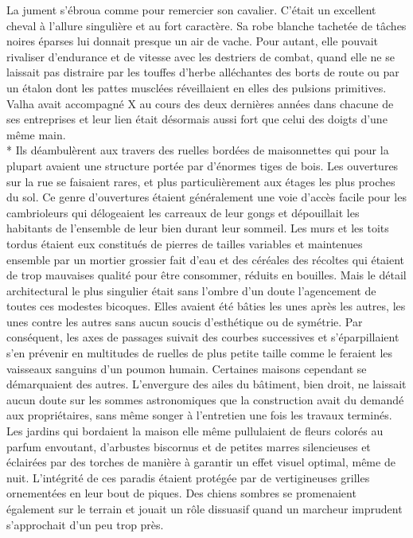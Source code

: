 \documentclass{book}
\begin{document}
La jument s'ébroua comme pour remercier son cavalier. C'était un excellent cheval à l'allure singulière et au fort caractère. Sa robe blanche tachetée de tâches noires éparses lui donnait presque un air de vache. Pour autant, elle pouvait rivaliser d'endurance et de vitesse avec les destriers de combat, quand elle ne se laissait pas distraire par les touffes d'herbe alléchantes 
des borts de route ou par un étalon dont les pattes musclées réveillaient en elles des pulsions primitives. Valha avait accompagné X au cours des deux dernières années dans chacune de ses entreprises et leur lien était désormais aussi fort que celui des doigts d'une même main.   \\*
Ils déambulèrent aux travers des ruelles bordées de maisonnettes qui pour la plupart avaient une structure portée par d'énormes tiges de bois. Les ouvertures sur la rue se faisaient rares, et plus particulièrement aux étages les plus proches du sol. Ce genre d'ouvertures étaient généralement une voie d'accès facile pour les cambrioleurs qui délogeaient les carreaux de leur gongs et dépouillait les habitants de l'ensemble de leur bien durant leur sommeil. Les murs et les toits tordus étaient eux constitués de pierres de tailles variables et maintenues ensemble par un mortier grossier fait d'eau et des céréales des récoltes qui étaient de trop mauvaises qualité pour être consommer, réduits en bouilles. Mais le détail architectural le plus singulier était sans l'ombre d'un doute l'agencement de toutes ces modestes bicoques. Elles avaient été bâties les unes après les autres, les unes contre les autres sans aucun soucis d’esthétique ou de symétrie. Par conséquent, les axes de passages suivait des courbes successives et s'éparpillaient s'en prévenir en multitudes de ruelles de plus petite taille comme le feraient les vaisseaux sanguins d'un poumon humain.
Certaines maisons cependant se démarquaient des autres. L'envergure des ailes du bâtiment, bien droit, ne laissait aucun doute sur les sommes astronomiques que la construction avait du demandé aux propriétaires, sans même songer à l'entretien une fois les travaux terminés. Les jardins qui bordaient la maison elle même pullulaient de fleurs colorés au parfum envoutant, d'arbustes biscornus et de petites marres silencieuses et éclairées par des torches de manière à garantir un effet visuel optimal, même de nuit. L'intégrité de ces paradis étaient protégée par de vertigineuses grilles ornementées en leur bout de piques. Des chiens sombres se promenaient également sur le terrain et jouait un rôle dissuasif quand un marcheur imprudent s'approchait d'un peu trop près.
\end{document}
